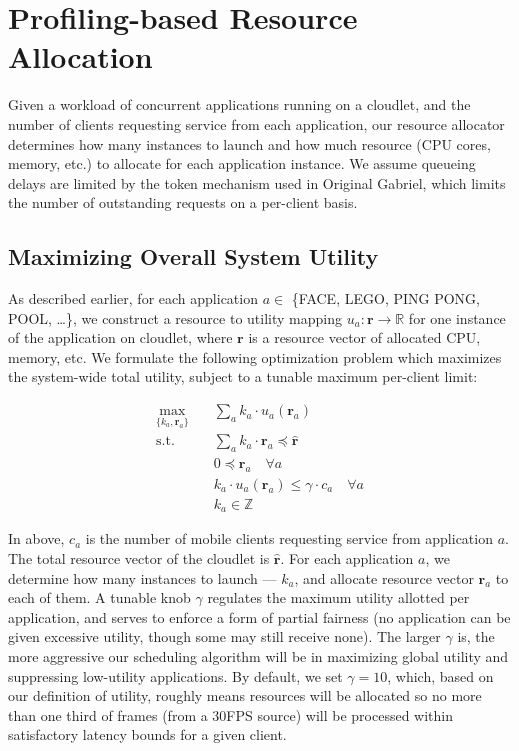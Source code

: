 \section{Profiling-based Resource Allocation}
\label{sec: resource-allocation}

Given a workload of concurrent applications running on a cloudlet, and the
number of clients requesting service from each application, our resource
allocator determines how many instances to launch and how much resource (CPU
cores, memory, etc.) to allocate for each application instance.  We assume
queueing delays are limited by the token mechanism used in Original Gabriel,
which limits the number of outstanding requests on a per-client basis.


\subsection{Maximizing Overall System Utility}

As described earlier, for each application $a \in $ \{FACE, LEGO, PING PONG, POOL, \ldots \}, 
we construct a resource to utility mapping
$u_a: \mathbf{r} \rightarrow \mathbb{R}$ for one instance of the application on cloudlet, 
where $\mathbf{r}$ is a resource vector of allocated CPU, memory, etc. We formulate the 
following optimization problem which maximizes the system-wide total utility,
subject to a tunable maximum per-client limit:

\begin{equation}
  \begin{aligned}
  \max_{\{k_a, \mathbf{r}_a\}} \quad & \sum_a{k_a \cdot u_a(\mathbf{r}_a)} \\
  \textrm{s.t.} \quad & \sum_a k_a \cdot \mathbf{r}_a \preccurlyeq \hat{\mathbf{r}} \\
      & 0 \preccurlyeq \mathbf{r}_a  \quad \forall a \\
      & k_a \cdot u_a(\mathbf{r}_a) \le \gamma \cdot c_a \quad \forall a \\
      & k_a \in \mathbb{Z}
  \end{aligned}
  \end{equation}

In above, $c_a$ is the number of mobile clients requesting service from application $a$.
The total resource vector of the cloudlet is  $\hat{\mathbf{r}}$. 
 For each application $a$, we determine how many instances to launch --- $k_a$, and 
allocate resource vector $\mathbf{r}_a$ to each of them.
A tunable knob $\gamma$ regulates the maximum utility allotted 
per application, and serves to enforce a form of partial fairness (no application
can be given excessive utility, though some may still receive none). 
The larger $\gamma$ is, the more aggressive our scheduling algorithm
will be in maximizing global utility and
suppressing low-utility applications. 
By default, we set $\gamma=10$, which, based on our definition of
utility, roughly means resources will be allocated so 
no more than one third of frames (from a 30FPS source) 
will be processed within satisfactory latency bounds for a given
client.

